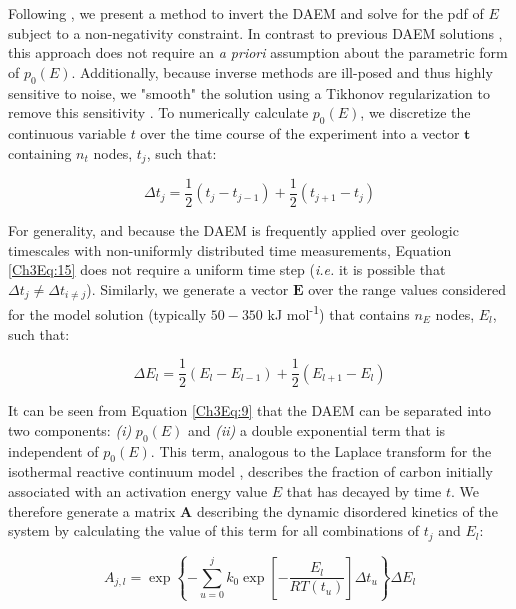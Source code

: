 Following \citet{Forney:2012dr,Forney:2012hz}, we present a method to invert the DAEM and solve for the pdf of $E$ subject to a non-negativity constraint. In contrast to previous DAEM solutions \citep{Lakshmanan:1994vs,Cai:2007hh,deCaprariis:2012jk}, this approach does not require an \textit{a priori} assumption about the parametric form of $p_{0}(E)$. Additionally, because inverse methods are ill-posed and thus highly sensitive to noise, we "smooth" the solution using a Tikhonov regularization to remove this sensitivity \citep{Tikhonov:1977ui,Hansen:1994uc}. To numerically calculate $p_{0}(E)$, we discretize the continuous variable $t$ over the time course of the experiment into a vector $\mathbf{t}$ containing $n_{t}$ nodes, $t_{j}$, such that:

\begin{equation}\label{Ch3Eq:15}
	\Delta t_{j} = \frac{1}{2} \left(t_{j} - t_{j-1} \right) + \frac{1}{2} \left(t_{j+1} - t_{j} \right)
\end{equation}

For generality, and because the DAEM is frequently applied over geologic timescales with non-uniformly distributed time measurements, Equation \ref{Ch3Eq:15} does not require a uniform time step (\textit{i.e.} it is possible that $\Delta t_{j} \neq \Delta t_{i \neq j}$). Similarly, we generate a vector $\mathbf{E}$ over the range values considered for the model solution (typically $50 - 350$ kJ mol\textsuperscript{-1}) that contains $n_{E}$ nodes, $E_{l}$, such that:

\begin{equation}\label{Ch3Eq:16}
	\Delta E_{l} = \frac{1}{2} \left(E_{l} - E_{l-1} \right) + \frac{1}{2} \left(E_{l+1} - E_{l} \right)
\end{equation}

It can be seen from Equation \ref{Ch3Eq:9} that the DAEM can be separated into two components: \textit{(i)} $p_{0}(E)$ and \textit{(ii)} a double exponential term that is independent of $p_{0}(E)$. This term, analogous to the Laplace transform for the isothermal reactive continuum model \citep{Forney:2012hz}, describes the fraction of carbon initially associated with an activation energy value $E$ that has decayed by time $t$. We therefore generate a matrix $\mathbf{A}$ describing the dynamic disordered kinetics of the system by calculating the value of this term for all combinations of $t_{j}$ and $E_{l}$:

\begin{equation}\label{Ch3Eq:17}
	A_{j,l} = \exp \left\{ -\sum_{u=0}^{j} k_{0} \exp \left[ - \frac{E_{l}}{RT(t_{u})} \right] \Delta t_{u} \right\} \Delta E_{l}
\end{equation}

